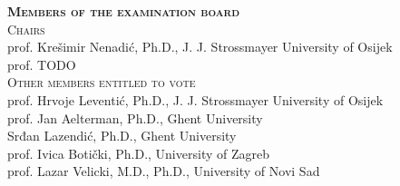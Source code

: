 \documentclass[
  11pt, %
  oneside, %
  english, %
  singlespacing, %
  liststotoc, %
  headsepline, %
  chapterinoneline, %
]{MastersDoctoralThesis} %
\begin{document}
\vfill

{\setlength{\parindent}{0cm}
\textsc{\textbf{Members of the examination board}}\\[0.35em]

\textsc{Chairs}\\[0.35em]

prof. Krešimir Nenadić, Ph.D., J. J. Strossmayer University of Osijek\\
prof. TODO\\[0.35em]

\textsc{Other members entitled to vote}\\[0.35em]

prof. Hrvoje Leventić, Ph.D., J. J. Strossmayer University of Osijek\\
prof. Jan Aelterman, Ph.D., Ghent University\\
Srđan Lazendić, Ph.D., Ghent University\\
prof. Ivica Botički, Ph.D., University of Zagreb\\
prof. Lazar Velicki, M.D., Ph.D., University of Novi Sad
}

\clearpage

% 










{\hypersetup{linkcolor=black} %
  \tableofcontents %
}


  
\end{document}

